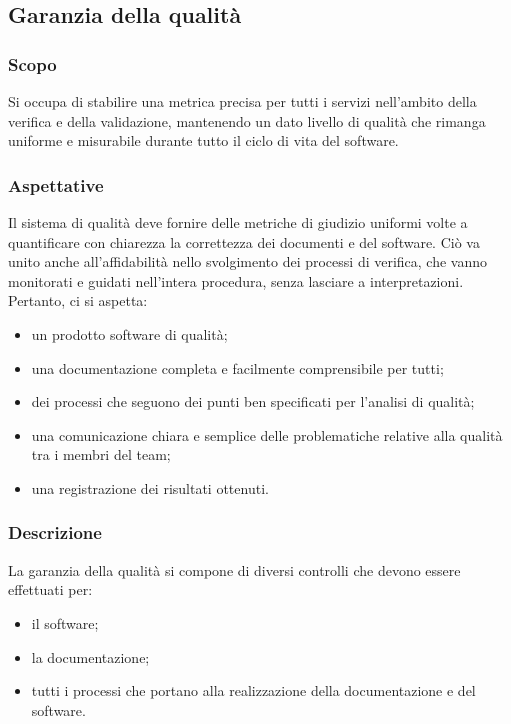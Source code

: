 \subsection{Garanzia della qualità}

	\subsubsection{Scopo}

		Si occupa di stabilire una metrica precisa per tutti i servizi nell'ambito della verifica e della validazione, mantenendo un dato livello di qualità che rimanga uniforme e misurabile durante tutto il ciclo di vita del software.

	\subsubsection{Aspettative}

		Il sistema di qualità deve fornire delle metriche di giudizio uniformi volte a quantificare con chiarezza la correttezza dei documenti e del software. Ciò va unito anche all'affidabilità nello svolgimento dei processi di verifica, che vanno monitorati e guidati nell'intera procedura, senza lasciare a interpretazioni. Pertanto, ci si aspetta:
		\begin{itemize}
			\item un prodotto software di qualità;
			\item una documentazione completa e facilmente comprensibile per tutti;
			\item dei processi che seguono dei punti ben specificati per l'analisi di qualità;
			\item una comunicazione chiara e semplice delle problematiche relative alla qualità tra i membri del team;
			\item una registrazione dei risultati ottenuti.
		\end{itemize}

	\subsubsection{Descrizione}

		La garanzia della qualità si compone di diversi controlli che devono essere effettuati per:
		\begin{itemize}
			\item il software;
			\item la documentazione;
			\item tutti i processi che portano alla realizzazione della documentazione e del software.
		\end{itemize}

